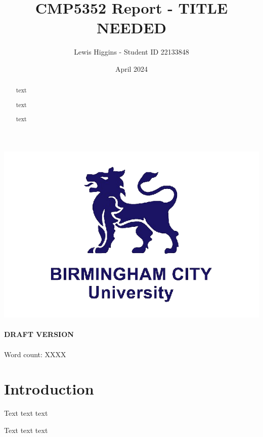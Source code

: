 \documentclass[12pt]{report}
\title{CMP5352 Report - TITLE NEEDED}
\author{Lewis Higgins - Student ID 22133848}
\date{April 2024}
\begin{document}
    \pagecolor{yellow} %

    \makeatletter
    \begin{titlepage}
        \begin{center}
            \includegraphics[width=0.7\linewidth]{bcu logo}\\[4ex]
            {\large \bfseries  \@title }\\[2ex]
            {\large \bfseries  DRAFT VERSION }\\[2ex]
            {\@author}\\[30ex]
            {Word count: XXXX}\\[20ex]
        \end{center}
    \end{titlepage}
    \makeatother
    \thispagestyle{empty}
    \newpage

    \pagecolor{white}

    \begin{abstract}
        text

        text

        text

    \end{abstract}

    \setcounter{page}{0} %

    \tableofcontents
    \thispagestyle{empty}


    \setcounter{page}{0} %

    \chapter*{Introduction}\label{ch:introduction}

    Text text text

    Text text text
\end{document}
